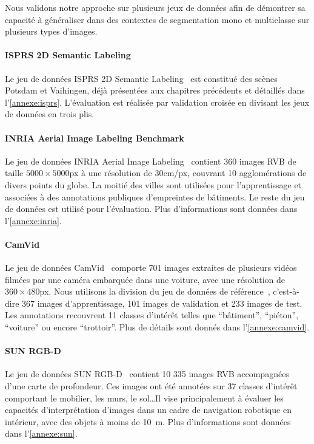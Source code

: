 Nous validons notre approche sur plusieurs jeux de données afin de démontrer sa capacité à généraliser dans des contextes de segmentation mono et multiclasse sur plusieurs types d'images.

\paragraph{ISPRS 2D Semantic Labeling}

Le jeu de données ISPRS 2D Semantic Labeling~\cite{rottensteiner_isprs_2012} est constitué des scènes Potsdam et Vaihingen, déjà présentées aux chapitres précédents et détaillés dans l'\cref{annexe:isprs}. L'évaluation est réalisée par validation croisée en divisant les jeux de données en trois plis.

\paragraph{INRIA Aerial Image Labeling Benchmark}
Le jeu de données INRIA Aerial Image Labeling~\cite{maggiori_can_2017} contient 360 images RVB de taille $5000\times5000$px à une résolution de 30cm/px, couvrant 10 agglomérations de divers points du globe. La moitié des villes sont utilisées pour l'apprentissage et associées à des annotations publiques d'empreintes de bâtiments. Le reste du jeu de données est utilisé pour l'évaluation. Plus d'informations sont données dans l'\cref{annexe:inria}.

\paragraph{CamVid}
Le jeu de données CamVid~\cite{brostow_semantic_2009} comporte 701 images extraites de plusieurs vidéos filmées par une caméra embarquée dans une voiture, avec une résolution de $360\times480$px. Nous utilisons la division du jeu de données de référence~\cite{badrinarayanan_segnet_2017}, c'est-à-dire 367 images d'apprentissage, 101 images de validation et 233 images de test. Les annotations recouvrent 11 classes d'intérêt telles que ``bâtiment'', ``piéton'', ``voiture'' ou encore ``trottoir''. Plus de détails sont donnés dans l'\cref{annexe:camvid}.

\paragraph{SUN RGB-D}
Le jeu de données SUN RGB-D~\cite{song_sun_2015} contient 10 335 images RVB accompagnées d'une carte de profondeur. Ces images ont été annotées sur 37 classes d'intérêt comportant le mobilier, les murs, le sol\dots Il vise principalement à évaluer les capacités d'interprétation d'images dans un cadre de navigation robotique en intérieur, avec des objets à moins de \SI{10}{\meter}. Plus d'informations sont données dans l'\cref{annexe:sun}.

